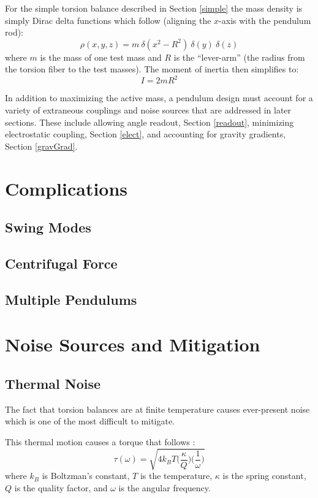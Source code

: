 \documentclass{book}
\begin{document}
For the simple torsion balance described in Section \ref{simple} the mass density is simply Dirac delta functions which follow (aligning the $x$-axis with the pendulum rod):
\begin{equation}
\rho(x,y,z)  = m\ \delta(x^2-R^2)\ \delta(y)\ \delta(z)
\end{equation}
where $m$ is the mass of one test mass and $R$ is the ``lever-arm'' (the radius from the torsion fiber to the test masses). The moment of inertia then simplifies to:
\begin{equation}
I=2 m R^2
\end{equation}

In addition to maximizing the active mass, a pendulum design must account for a variety of extraneous couplings and noise sources that are addressed in later sections. These include allowing angle readout, Section \ref{readout}, minimizing electrostatic coupling, Section \ref{elect}, and accounting for gravity gradients, Section \ref{gravGrad}. 

\chapter{Complications}
\section{Swing Modes} \label{swing}
\section{Centrifugal Force}
\section{Multiple Pendulums}

\chapter{Noise Sources and Mitigation}
\section{Thermal Noise} \label{thermal}

\quad The fact that torsion balances are at finite temperature causes ever-present noise which is one of the most difficult to mitigate. 

This thermal motion causes a torque that follows \cite{thermal}:
\begin{equation}
\tau (\omega)= \sqrt{4 k_B T\bigg( \frac{\kappa}{Q} \bigg) \bigg( \frac{1}{\omega} \bigg)}
\end{equation}
where $k_B$ is Boltzman's constant, $T$ is the temperature, $\kappa$ is the spring constant, $Q$ is the quality factor, and $\omega$ is the angular frequency.
\end{document}
